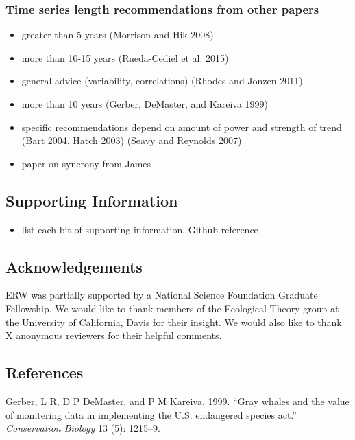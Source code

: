 \documentclass[12pt,]{article}
\providecommand{\tightlist}{%
  \setlength{\itemsep}{0pt}\setlength{\parskip}{0pt}}
\begin{document}
\subsubsection{Time series length recommendations from other
papers}\label{time-series-length-recommendations-from-other-papers}

\begin{itemize}
\tightlist
\item
  greater than 5 years (Morrison and Hik 2008)
\item
  more than 10-15 years (Rueda-Cediel et al. 2015)
\item
  general advice (variability, correlations) (Rhodes and Jonzen 2011)
\item
  more than 10 years (Gerber, DeMaster, and Kareiva 1999)
\item
  specific recommendations depend on amount of power and strength of
  trend (Bart 2004, Hatch 2003) (Seavy and Reynolds 2007)
\item
  paper on syncrony from James
\end{itemize}

\subsection{Supporting Information}\label{supporting-information}

\begin{itemize}
\tightlist
\item
  list each bit of supporting information. Github reference
\end{itemize}

\subsection{Acknowledgements}\label{acknowledgements}

ERW was partially supported by a National Science Foundation Graduate
Fellowship. We would like to thank members of the Ecological Theory
group at the University of California, Davis for their insight. We would
also like to thank X anonymous reviewers for their helpful comments.

\subsection*{References}\label{references}

\hypertarget{refs}{}
\hypertarget{ref-Gerber1999}{}
Gerber, L R, D P DeMaster, and P M Kareiva. 1999. ``Gray whales and the
value of monitering data in implementing the U.S. endangered species
act.'' \emph{Conservation Biology} 13 (5): 1215--9.
\end{document}
